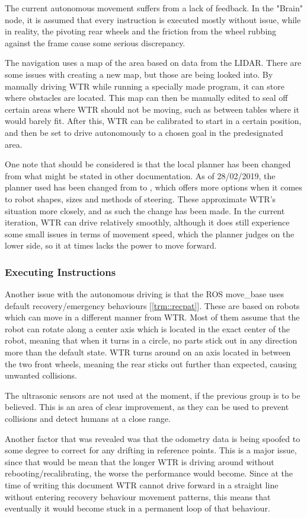The current autonomous movement suffers from a lack of feedback.
In the "Brain" node, it is assumed that every instruction is executed mostly without issue, while in reality, the pivoting rear wheels and the friction from the wheel rubbing against the frame cause some serious discrepancy.

The navigation uses a map of the area based on data from the LIDAR.
There are some issues with creating a new map, but those are being looked into.
By manually driving WTR while running a specially made program, it can store where obstacles are located.
This map can then be manually edited to seal off certain areas where WTR should not be moving, such as between tables where it would barely fit.
After this, WTR can be calibrated to start in a certain position, and then be set to drive autonomously to a chosen goal in the predesignated area.

One note that should be considered is that the local planner has been changed from what might be stated in other documentation.
As of 28/02/2019, the planner used has been changed from  to , which offers more options when it comes to robot shapes, sizes and methods of steering.
These approximate WTR's situation more closely, and as such the change has been made.
In the current iteration, WTR can drive relatively smoothly, although it does still experience some small issues in terms of movement speed, which the  planner judges on the lower side, so it at times lacks the power to move forward.

\subsubsection{Executing Instructions}
Another issue with the autonomous driving is that the ROS move\_base uses default recovery/emergency behaviours [\ref{trm::recpat}].
These are based on robots which can move in a different manner from WTR.
Most of them assume that the robot can rotate along a center axis which is located in the exact center of the robot, meaning that when it turns in a circle, no parts stick out in any direction more than the default state.
WTR turns around on an axis located in between the two front wheels, meaning the rear sticks out further than expected, causing unwanted collisions.

The ultrasonic sensors are not used at the moment, if the previous group is to be believed.
This is an area of clear improvement, as they can be used to prevent collisions and detect humans at a close range.

Another factor that was revealed was that the odometry data is being spoofed to some degree to correct for any drifting in reference points.
This is a major issue, since that would be mean that the longer WTR is driving around without rebooting/recalibrating, the worse the performance would become.
Since at the time of writing this document WTR cannot drive forward in a straight line without entering recovery behaviour movement patterns, this means that eventually it would become stuck in a permanent loop of that behaviour.

\newpage
